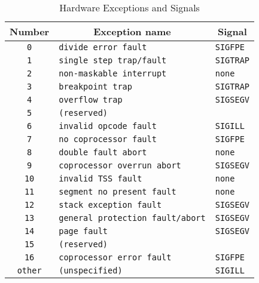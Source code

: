 \begin{table}
\Hrule
  \caption{Hardware Exceptions and Signals}
  \label{tab-hw-exceptions}
  \begin{center}
    \begin{tabular}[t]{c|l|l}
      \multicolumn{1}{c}{Number} & \multicolumn{1}{c}{Exception name}
         & \multicolumn{1}{c}{Signal}\\
      \hline
      \texttt{0} & \texttt{divide error fault} & \texttt{SIGFPE} \\
      \texttt{1} & \texttt{single step trap/fault} & \texttt{SIGTRAP} \\
      \texttt{2} & \texttt{non-maskable interrupt} & \texttt{none} \\
      \texttt{3} & \texttt{breakpoint trap} & \texttt{SIGTRAP} \\
      \texttt{4} & \texttt{overflow trap} & \texttt{SIGSEGV} \\
      \texttt{5} & \texttt{(reserved)} &\\
      \texttt{6} & \texttt{invalid opcode fault} & \texttt{SIGILL} \\
      \texttt{7} & \texttt{no coprocessor fault} & \texttt{SIGFPE} \\
      \texttt{8} & \texttt{double fault abort} & \texttt{none} \\
      \texttt{9} & \texttt{coprocessor overrun abort} & \texttt{SIGSEGV} \\
      \texttt{10} & \texttt{invalid TSS fault} & \texttt{none} \\
      \texttt{11} & \texttt{segment no present fault} & \texttt{none} \\
      \texttt{12} & \texttt{stack exception fault} & \texttt{SIGSEGV} \\
      \texttt{13} & \texttt{general protection fault/abort}&\texttt{SIGSEGV} \\
      \texttt{14} & \texttt{page fault} & \texttt{SIGSEGV} \\
      \texttt{15} & \texttt{(reserved)} &\\
      \texttt{16} & \texttt{coprocessor error fault} & \texttt{SIGFPE} \\
      \texttt{other} & \texttt{(unspecified)} & \texttt{SIGILL}
    \end{tabular}
  \end{center}
\Hrule
\end{table}

